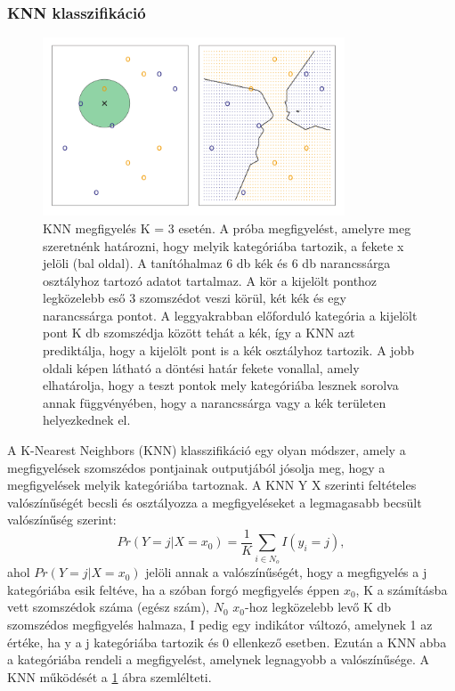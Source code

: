 \documentclass[12pt]{article}
\theoremstyle{plain}
\begin{document}
\subsubsection*{KNN klasszifikáció}
\begin{figure}
    \begin{center}
    \includegraphics[width=0.8\textwidth]{media/knn1.png}
    \caption{KNN megfigyelés K = 3 esetén. A próba megfigyelést, amelyre meg szeretnénk határozni, hogy melyik kategóriába tartozik, a fekete x jelöli (bal oldal). A tanítóhalmaz 6 db kék és 6 db narancssárga osztályhoz tartozó adatot tartalmaz. A kör a kijelölt ponthoz legközelebb eső 3 szomszédot veszi körül, két kék és egy narancssárga pontot. A leggyakrabban előforduló kategória a kijelölt pont K db szomszédja között tehát a kék, így a KNN azt prediktálja, hogy a kijelölt pont is a kék osztályhoz tartozik. A jobb oldali képen látható a döntési határ fekete vonallal, amely elhatárolja, hogy a teszt pontok mely kategóriába lesznek sorolva annak függvényében, hogy a narancssárga vagy a kék területen helyezkednek el. } 
    \label{knn1}
    \end{center}
\end{figure}

A K-Nearest Neighbors (KNN) klasszifikáció egy olyan módszer, amely a megfigyelések szomszédos pontjainak outputjából jósolja meg, hogy a megfigyelések melyik kategóriába tartoznak.  A KNN Y X szerinti feltételes valószínűségét becsli és osztályozza a megfigyeléseket a legmagasabb becsült valószínűség szerint: 
$$ Pr(Y=j | X = x_0) = \frac{1}{K} \sum_{i \in N_o} I(y_i = j), $$ ahol $Pr(Y=j | X = x_0) $ jelöli annak a valószínűségét, hogy a megfigyelés a j kategóriába esik feltéve, ha a szóban forgó megfigyelés éppen $x_0$, K a számításba vett szomszédok száma (egész szám), $N_0 $ $x_0$-hoz legközelebb levő K db szomszédos megfigyelés halmaza, I pedig egy indikátor változó, amelynek 1 az értéke, ha y a j kategóriába tartozik és 0 ellenkező esetben. Ezután a KNN abba a kategóriába rendeli a megfigyelést, amelynek legnagyobb a valószínűsége. A KNN működését a \ref{knn1} ábra szemlélteti. 
\end{document}

